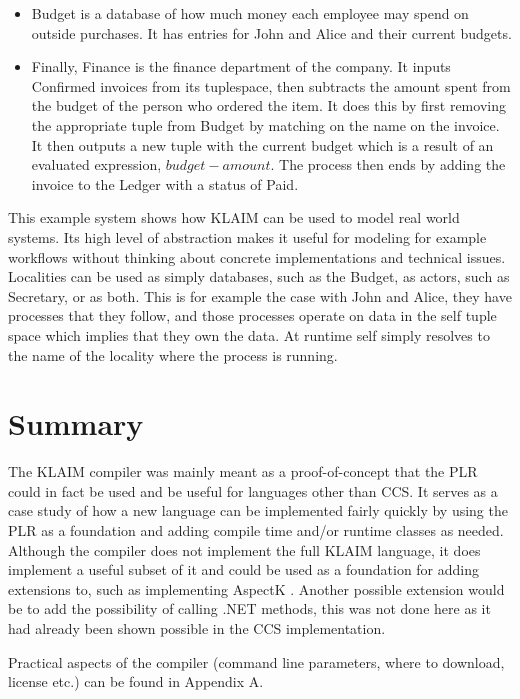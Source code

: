 \begin{itemize}
		\item \textsf{Budget} is a database of how much money each employee may 
		spend on outside purchases. It has entries for \textsf{John} and 
		\textsf{Alice} and their current budgets.
		
		\item Finally, \textsf{Finance} is the finance department of the company. 
		It inputs \textsf{Confirmed} invoices from its tuplespace, then subtracts 
		the amount spent from the budget of the person who ordered the item. It 
		does this by first removing the appropriate tuple from \textsf{Budget} by 
		matching on the name on the invoice. It then outputs a new tuple with the 
		current budget which is a result of an evaluated expression, $budget - 
		amount$. The process then ends by adding the invoice to the \textsf{Ledger}
		with a status of \textsf{Paid}.
		
	\end{itemize}
	
	This example system shows how KLAIM can be used to model real world systems. 
	Its high level of abstraction makes it useful for modeling for example 
	workflows without thinking about concrete implementations and technical 
	issues. Localities can be used as simply databases, such as the 
	\textsf{Budget}, as actors, such as \textsf{Secretary}, or as both. This is 
	for example the case with \textsf{John} and \textsf{Alice}, they have 
	processes that they follow, and those processes operate on data in the 
	\textsf{self} tuple space which implies that they own the data. 
	At runtime \textsf{self} simply resolves to the name of the locality where 
	the process is running.

\section{Summary}

	The KLAIM compiler was mainly meant as a proof-of-concept that the PLR could 
	in fact be used and be useful for languages other than CCS. It serves as a 
	case study of how a new language can be implemented fairly quickly by using 
	the PLR as a foundation and adding compile time and/or runtime classes as 
	needed. Although the compiler does not implement the full KLAIM language, it 
	does implement a useful subset of it and could be used as a foundation for 
	adding extensions to, such as implementing AspectK \cite{aspectk}. Another 
	possible extension would be to add the possibility of calling .NET methods, 
	this was not done here as it had already been shown possible in the CCS 
	implementation.
	
	Practical aspects of the compiler (command line parameters, where to 
	download, license etc.) can be found in Appendix A.
